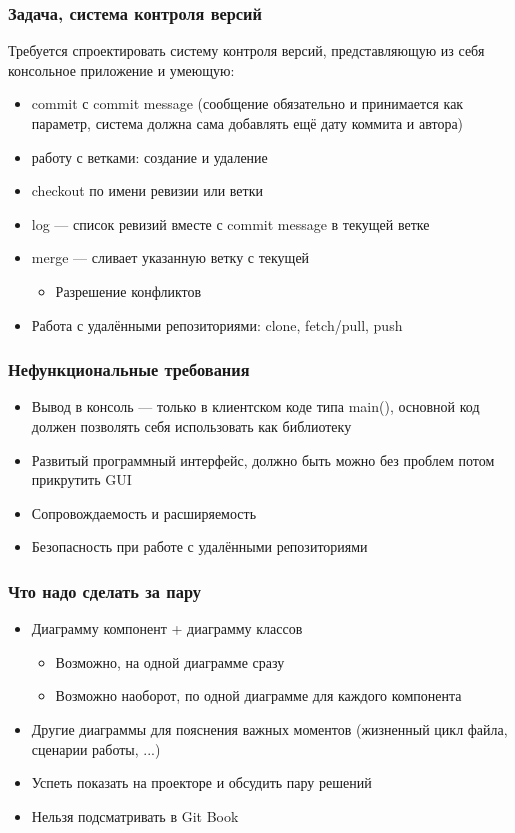 \documentclass{../../slides-style}
\begin{document}
	
	\begin{frame}[plain]
	        \titlepage
	\end{frame}

	\begin{frame}
		\frametitle{Задача, система контроля версий}
		Требуется спроектировать систему контроля версий, представляющую из себя консольное приложение и умеющую:
		\begin{itemize}
			\item commit с commit message (сообщение обязательно и принимается как параметр, система должна сама добавлять ещё дату коммита и автора)
			\item работу с ветками: создание и удаление
			\item checkout по имени ревизии или ветки
			\item log --- список ревизий вместе с commit message в текущей ветке
			\item merge --- сливает указанную ветку с текущей
			\begin{itemize}
				\item Разрешение конфликтов
			\end{itemize}
			\item Работа с удалёнными репозиториями: clone, fetch/pull, push
		\end{itemize}
	\end{frame}

	\begin{frame}
		\frametitle{Нефункциональные требования}
		\begin{itemize}
			\item Вывод в консоль --- только в клиентском коде типа main(), основной код должен позволять себя использовать как библиотеку
			\item Развитый программный интерфейс, должно быть можно без проблем потом прикрутить GUI
			\item Сопровождаемость и расширяемость
			\item Безопасность при работе с удалёнными репозиториями
		\end{itemize}
	\end{frame}

	\begin{frame}
		\frametitle{Что надо сделать за пару}
		\begin{itemize}
			\item Диаграмму компонент + диаграмму классов
			\begin{itemize}
				\item Возможно, на одной диаграмме сразу
				\item Возможно наоборот, по одной диаграмме для каждого компонента
			\end{itemize}
			\item Другие диаграммы для пояснения важных моментов (жизненный цикл файла, сценарии работы, ...)
			\item Успеть показать на проекторе и обсудить пару решений
			\item Нельзя подсматривать в Git Book
		\end{itemize}
	\end{frame}
\end{document}
